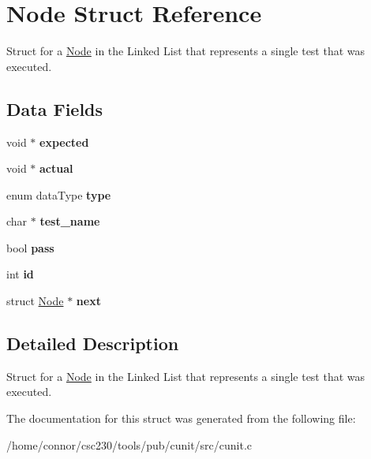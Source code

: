 \hypertarget{structNode}{\section{Node Struct Reference}
\label{structNode}
}


Struct for a \hyperlink{structNode}{Node} in the Linked List that represents a single test that was executed.  


\subsection*{Data Fields}
\begin{DoxyCompactItemize}
\item 
\hypertarget{structNode_a20ebf781d575bd7c4f585776f0d3bdfb}{void $\ast$ {\bfseries expected}}\label{structNode_a20ebf781d575bd7c4f585776f0d3bdfb}

\item 
\hypertarget{structNode_a0235933988d048399cedf9650778951d}{void $\ast$ {\bfseries actual}}\label{structNode_a0235933988d048399cedf9650778951d}

\item 
\hypertarget{structNode_a4b82a2c4da56d7834a06931b3167adff}{enum data\-Type {\bfseries type}}\label{structNode_a4b82a2c4da56d7834a06931b3167adff}

\item 
\hypertarget{structNode_a2927b32238dae2356045eb7fc6846757}{char $\ast$ {\bfseries test\-\_\-name}}\label{structNode_a2927b32238dae2356045eb7fc6846757}

\item 
\hypertarget{structNode_ab38ea6ae0c9f1b4aacb8bc86bfc6f827}{bool {\bfseries pass}}\label{structNode_ab38ea6ae0c9f1b4aacb8bc86bfc6f827}

\item 
\hypertarget{structNode_a59a543130a10c95f1e8642cf8c5645e8}{int {\bfseries id}}\label{structNode_a59a543130a10c95f1e8642cf8c5645e8}

\item 
\hypertarget{structNode_af67b110ca1a258b793bf69d306929b22}{struct \hyperlink{structNode}{Node} $\ast$ {\bfseries next}}\label{structNode_af67b110ca1a258b793bf69d306929b22}

\end{DoxyCompactItemize}


\subsection{Detailed Description}
Struct for a \hyperlink{structNode}{Node} in the Linked List that represents a single test that was executed. 

The documentation for this struct was generated from the following file\-:\begin{DoxyCompactItemize}
\item 
/home/connor/csc230/tools/pub/cunit/src/cunit.\-c\end{DoxyCompactItemize}
